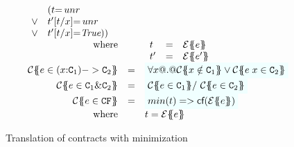 \begin{figure}
\[\begin{array}{c}
\begin{array}{rcl}
\begin{array}[t]{l}
                           \;\;\begin{array}[t]{ll}
                                      & (t{=}\unr\\ 
                                 \lor & t'[t/x]{=}\unr \\ 
                                 \lor & t'[t/x]{=}\True))
                                \end{array}
        \end{array} \\
 \mbox{where}  &  &
    \begin{array}[t]{lcl}
      t  & = & \etrans{\Sigma}{\Gamma}{e} \\
      t' & = & \etrans{\Sigma}{\Gamma}{e'}
    \end{array}
\\
\ctrans{\Sigma}{\Gamma}{e \in (x{:}\Ct_1) -> \Ct_2}
  & = & \formula{\forall x @.@ \ctrans{\Sigma}{\Gamma,x}{x \notin \Ct_1} 
                          \lor \ctrans{\Sigma}{\Gamma,x}{e\;x \in \Ct_2}}
\\
\ctrans{\Sigma}{\Gamma}{e \in \Ct_1 \& \Ct_2}
   & = & \formula{ \ctrans{\Sigma}{\Gamma}{e \in \Ct_1} /\ \ctrans{\Sigma}{\Gamma}{e \in \Ct_2}}
\\
\ctrans{\Sigma}{\Gamma}{e \in \CF} & = & \formula{min(t) => \lcf{\etrans{\Sigma}{\Gamma}{e}}} \\
\mbox{where}  &  & t = \etrans{\Sigma}{\Gamma}{e}
\end{array}
\end{array}\]
\caption{Translation of contracts with minimization}\label{fig:min-typing}
\end{figure}



